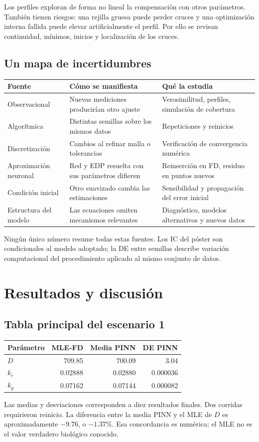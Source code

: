 \documentclass[11pt,a4paper]{report}
\begin{document}
Los perfiles exploran de forma no lineal la compensación con otros parámetros. También tienen riesgos: una rejilla gruesa puede perder cruces y una optimización interna fallida puede elevar artificialmente el perfil. Por ello se revisan continuidad, mínimos, inicios y localización de los cruces.

\section{Un mapa de incertidumbres}
\begin{longtable}{p{}p{}p{}}
\toprule Fuente & Cómo se manifiesta & Qué la estudia\\\midrule
Observacional & Nuevas mediciones producirían otro ajuste & Verosimilitud, perfiles, simulación de cobertura\\
Algorítmica & Distintas semillas sobre los mismos datos & Repeticiones y reinicios\\
Discretización & Cambios al refinar malla o tolerancias & Verificación de convergencia numérica\\
Aproximación neuronal & Red y EDP resuelta con sus parámetros difieren & Reinserción en FD, residuo en puntos nuevos\\
Condición inicial & Otro suavizado cambia las estimaciones & Sensibilidad y propagación del error inicial\\
Estructura del modelo & Las ecuaciones omiten mecanismos relevantes & Diagnóstico, modelos alternativos y nuevos datos\\\bottomrule
\end{longtable}
Ningún único número resume todas estas fuentes. Los IC del póster son condicionales al modelo adoptado; la DE entre semillas describe variación computacional del procedimiento aplicado al mismo conjunto de datos.

\chapter{Resultados y discusión}
\section{Tabla principal del escenario 1}
\begin{center}
\begin{tabular}{lrrr}\toprule
Parámetro & MLE-FD & Media PINN & DE PINN\\\midrule
$D$ & 709.85 & 700.09 & 3.04\\
$k_r$ & 0.02888 & 0.02880 & 0.000036\\
$k_g$ & 0.07162 & 0.07144 & 0.000082\\\bottomrule
\end{tabular}
\end{center}
Las medias y desviaciones corresponden a diez resultados finales. Dos corridas requirieron reinicio. La diferencia entre la media PINN y el MLE de $D$ es aproximadamente $-9.76$, o $-1.37\%$. Esa concordancia es numérica; el MLE no es el valor verdadero biológico conocido.
\end{document}
